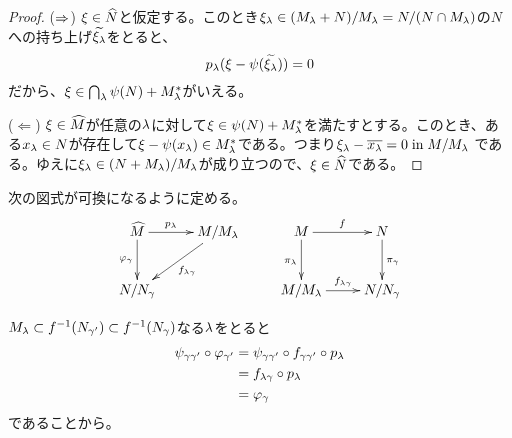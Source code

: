 \begin{proof}
  ($\Rightarrow$) $\xi \in \widehat{N}$と仮定する。このとき$\xi_{{\lambda}} \in (M_{{\lambda}} + N)/M_{{\lambda}} = N/(N \cap M_{{\lambda}})$の$N$への持ち上げ$\widetilde{\xi_{{\lambda}}}$をとると、
  \[
  p_{{\lambda}}(\xi - \psi(\widetilde{\xi_{{\lambda}}})) = 0
  \]
  だから、$\xi \in \bigcap_{{\lambda}} \psi(N) + M^*_{{\lambda}}$がいえる。

  ($\Leftarrow$) $\xi \in \widehat{M}$が任意の${\lambda}$に対して$\xi \in \psi(N) + M^*_{{\lambda}}$を満たすとする。このとき、ある$x_{{\lambda}} \in N$が存在して$\xi - \psi(x_{{\lambda}}) \in M^*_{{\lambda}}$である。つまり$\xi_{{\lambda}} - \overline{x_{{\lambda}}} = 0 \; \text{in} \; M/M_{{\lambda}}$
  である。ゆえに$\xi_{{\lambda}} \in (N+M_{{\lambda}})/M_{{\lambda}}$が成り立つので、$\xi \in \widehat{N}$である。
\end{proof}




\begin{rem}
  次の図式が可換になるように定める。
  \[
  \xymatrix{
  \wh{M} \ar[r]^-{p_{\grl}} \ar[d]_-{\vp_{\grg}} & M/M_{\grl} \ar[dl]^-{f_{\grl \grg}}     &  M \ar[r]^-f \ar[d]_{\pi_{\grl}} & N \ar[d]^{\pi_{\grg}} \\
  N/N_{\grg} & {}      &  M/M_{\grl} \ar[r]^-{f_{\grl \grg}} & N/N_{\grg}
  }
  \]
\end{rem}



\begin{rem}
  $M_{{\lambda} } \subset f^{-1}(N_{{\gamma}'}) \subset f^{-1}(N_{{\gamma}})$なる${\lambda}$をとると
  \begin{align*}
    \psi_{{\gamma} {\gamma}'} \circ {\varphi}_{{\gamma}'} &= \psi_{{\gamma} {\gamma}'} \circ f_{{\gamma} {\gamma}'} \circ p_{{\lambda}} \\
    &= f_{{\lambda} {\gamma}} \circ p_{{\lambda}} \\
    &= {\varphi}_{{\gamma}}
  \end{align*}
  であることから。
\end{rem}




